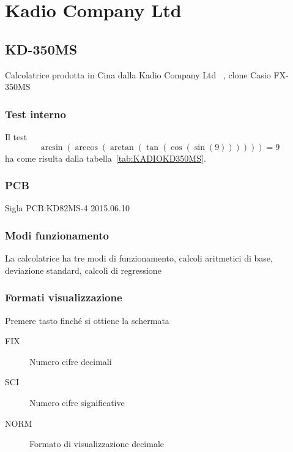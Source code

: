 \chapter{Kadio Company Ltd}
\section{KD-350MS}
Calcolatrice prodotta in Cina dalla Kadio Company Ltd~\cite{wiki2021} , clone Casio FX-350MS
\subsection{Test interno}
Il test\[\arcsin(\arccos(\arctan(\tan(\cos(\sin(9))))))=9\] ha come risulta dalla tabella~\vref{tab:KADIOKD350MS}. 
\subsection{PCB}
Sigla PCB:KD82MS-4 2015.06.10
\subsection{Modi funzionamento}
La calcolatrice ha tre modi di funzionamento, calcoli aritmetici di base, deviazione standard, calcoli di regressione
\subsection{Formati visualizzazione}
Premere tasto \tastomode finché si ottiene la schermata
\begin{center}
	\CASIOmodediplayexp
	
\end{center}
\begin{description}
	\item[ FIX]Numero cifre decimali
	\item[ SCI]Numero cifre significative
	\item[ NORM]Formato di visualizzazione decimale
\end{description}
